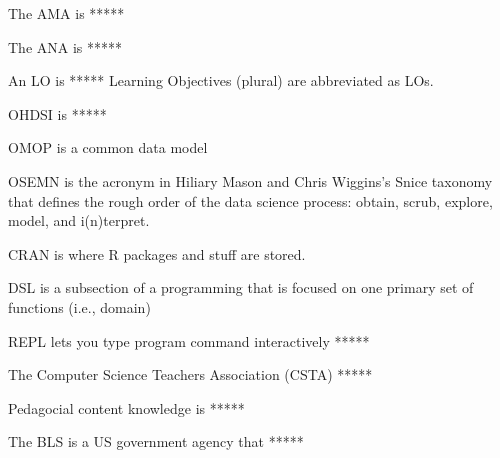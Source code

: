 \documentclass[main.tex]{subfiles}
\begin{document}
  The AMA is *****


  The ANA is *****


  An LO is *****
  Learning Objectives (plural) are abbreviated as LOs.


  OHDSI is *****


  OMOP is a common data model


  OSEMN is the acronym in Hiliary Mason and Chris Wiggins's Snice taxonomy that defines
  the rough order of the data science process:
  obtain, scrub, explore, model, and i(n)terpret.


  CRAN is where R packages and stuff are stored.


  DSL is a subsection of a programming that is focused on one primary set of functions (i.e., domain)


  REPL lets you type program command interactively *****


  The Computer Science Teachers Association (CSTA) *****


  Pedagocial content knowledge is *****


  The BLS is a US government agency that *****

\end{document}
